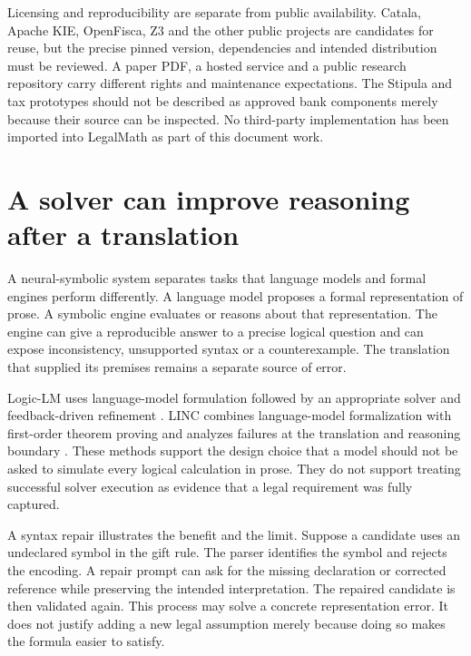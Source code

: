 Licensing and reproducibility are separate from public availability. Catala,
Apache KIE, OpenFisca, Z3 and the other public projects are candidates for reuse,
but the precise pinned version, dependencies and intended distribution must be
reviewed. A paper PDF, a hosted service and a public research repository carry
different rights and maintenance expectations. The Stipula and tax prototypes
should not be described as approved bank components merely because their source
can be inspected. No third-party implementation has been imported into LegalMath
as part of this document work.

\section{A solver can improve reasoning after a translation}
\label{merge:M04:10}

\label{sec:languages-neurosymbolic}
A neural-symbolic system separates tasks that language models and formal
engines perform differently. A language model proposes a formal representation
of prose. A symbolic engine evaluates or reasons about that representation.
The engine can give a reproducible answer to a precise logical question and
can expose inconsistency, unsupported syntax or a counterexample. The
translation that supplied its premises remains a separate source of error.

Logic-LM uses language-model formulation followed by an appropriate solver and
feedback-driven refinement \citep[sec.~3 and prompt appendices]{logiclm2023}.
LINC combines language-model formalization with first-order theorem proving
and analyzes failures at the translation and reasoning boundary
\citep[method and error analysis]{linc2023}. These methods support the design
choice that a model should not be asked to simulate every logical calculation
in prose. They do not support treating successful solver execution as evidence
that a legal requirement was fully captured.

A syntax repair illustrates the benefit and the limit. Suppose a candidate
uses an undeclared symbol in the gift rule. The parser identifies the symbol
and rejects the encoding. A repair prompt can ask for the missing declaration
or corrected reference while preserving the intended interpretation. The
repaired candidate is then validated again. This process may solve a concrete
representation error. It does not justify adding a new legal assumption
merely because doing so makes the formula easier to satisfy.

